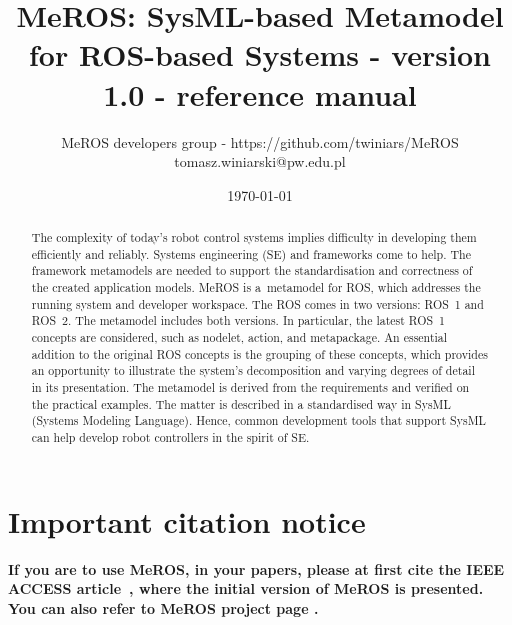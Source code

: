 \documentclass[11pt,oneside,a4paper]{article}
\begin{document}
	
	\title{MeROS: SysML-based Metamodel for ROS-based Systems - version 1.0 - reference manual}
\author{MeROS developers group - https://github.com/twiniars/MeROS \\ tomasz.winiarski@pw.edu.pl}
\date{\today}
\maketitle


	\begin{abstract}
		The complexity of today's robot control systems implies difficulty in developing them efficiently and reliably. Systems engineering (SE) and frameworks come to help. The framework metamodels are needed to support the standardisation and correctness of the created application models. MeROS is a~metamodel for ROS, which addresses the running system and developer workspace. The ROS comes in two versions: ROS~1 and ROS~2. The metamodel includes both versions. In particular, the latest ROS~1 concepts are considered, such as nodelet, action, and metapackage. An essential addition to the original ROS concepts is the grouping of these concepts, which provides an opportunity to illustrate the system's decomposition and varying degrees of detail in its presentation. The metamodel is derived from the requirements and verified on the practical examples. The matter is described in a standardised way in SysML (Systems Modeling Language). Hence, common development tools that support SysML can help develop robot controllers in the spirit of SE.
	\end{abstract}
	
	
	
	\maketitle
	
	\section*{Important citation notice}

\textbf{If you are to use MeROS, in your papers, please at first cite the IEEE ACCESS  article~\cite{meros-access}, where the initial version of MeROS is presented. You can also refer to MeROS project page \cite{meros-www}.}
	
	
\end{document}
